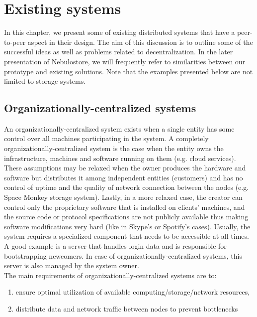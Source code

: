 \documentclass{pracamgren}
\begin{document}
\chapter{Existing systems}\label{r:existing}

In this chapter, we present some of existing distributed systems that have a peer-to-peer aspect in their design. The aim of this discussion is to outline some of the successful ideas as well as problems related to decentralization. In the later presentation of Nebulostore, we will frequently refer to similarities between our prototype and existing solutions. Note that the examples presented below are not limited to storage systems.\\

\section{Organizationally-centralized systems}

An organizationally-centralized system exists when a single entity has some control over all machines participating in the system. A completely organizationally-centralized system is the case when the entity owns the infrastructure, machines and software running on them (e.g. cloud services). These assumptions may be relaxed when the owner produces the hardware and software but distributes it among independent entities (customers) and has no control of uptime and the quality of network connection between the nodes (e.g. Space Monkey \cite{space_monkey} storage system). Lastly, in a more relaxed case, the creator can control only the proprietary software that is installed on clients' machines, and the source code or protocol specifications are not publicly available thus making software modifications very hard (like in Skype's \cite{skype} or Spotify's \cite{spotify} cases). Usually, the system requires a specialized component that needs to be accessible at all times. A good example is a server that handles login data and is responsible for bootstrapping newcomers. In case of organizationally-centralized systems, this server is also managed by the system owner.\\

The main requirements of organizationally-centralized systems are to:
\begin{enumerate}
  \item ensure optimal utilization of available computing/storage/network resources,
  \item distribute data and network traffic between nodes to prevent bottlenecks
\end{enumerate}
\end{document}
